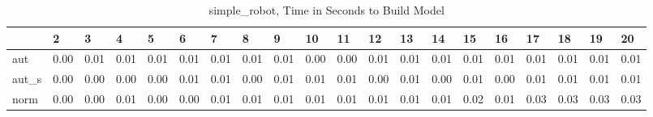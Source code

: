 \begin{table}
\centering
\caption{simple_robot, Time in Seconds to Build Model}
\label{simple_robot_model_time}
\begin{tabular}{llllllllllllllllllll}
\toprule
{} &     2 &     3 &     4 &     5 &     6 &     7 &     8 &     9 &    10 &    11 &    12 &    13 &    14 &    15 &    16 &    17 &    18 &    19 &    20 \\
\midrule
aut   &  0.00 &  0.01 &  0.01 &  0.01 &  0.01 &  0.01 &  0.01 &  0.01 &  0.00 &  0.00 &  0.01 &  0.01 &  0.01 &  0.01 &  0.01 &  0.01 &  0.01 &  0.01 &  0.01 \\
aut\_s &  0.00 &  0.00 &  0.00 &  0.00 &  0.01 &  0.01 &  0.00 &  0.01 &  0.01 &  0.01 &  0.00 &  0.01 &  0.00 &  0.01 &  0.00 &  0.01 &  0.01 &  0.01 &  0.01 \\
norm  &  0.00 &  0.00 &  0.01 &  0.00 &  0.00 &  0.01 &  0.01 &  0.01 &  0.01 &  0.01 &  0.01 &  0.01 &  0.01 &  0.02 &  0.01 &  0.03 &  0.03 &  0.03 &  0.03 \\
\bottomrule
\end{tabular}
\end{table}
